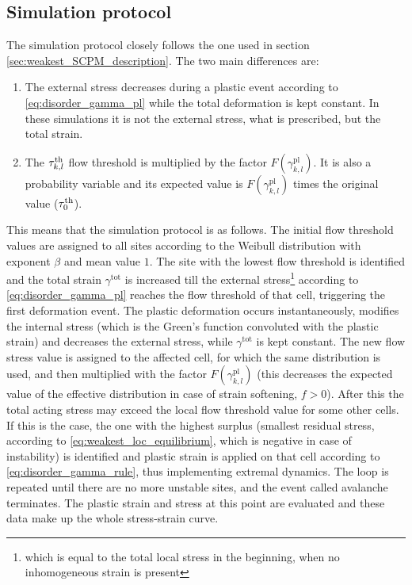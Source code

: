 \subsection{Simulation protocol}
The simulation protocol closely follows the one used in section \ref{sec:weakest_SCPM_description}. The two main differences are:
\begin{enumerate}
\item The external stress decreases during a plastic event according to \cref{eq:disorder_gamma_pl} while the total deformation is kept constant. In these simulations it is not the external stress, what is prescribed, but the total strain.
\item The $\tau _{k,l}^{{\rm{th}}}$ flow threshold is multiplied by the factor $F\left( {\gamma _{k,l}^{{\text{pl}}}} \right)$. It is also a probability variable and its expected value is $F\left( {\gamma _{k,l}^{{\text{pl}}}} \right)$ times the original value ($\tau _0^{{\rm{th}}}$).
\end{enumerate}
This means that the simulation protocol is as follows. The initial flow threshold values are assigned to all sites according to the Weibull distribution with exponent $\beta$ and mean value $1$. The site with the lowest flow threshold is identified and the total strain ${\gamma ^{{\text{tot}}}}$ is increased till the external stress\footnote{which is equal to the total local stress in the beginning, when no inhomogeneous strain is present} according to \cref{eq:disorder_gamma_pl} reaches the flow threshold of that cell, triggering the first deformation event. The plastic deformation occurs instantaneously, modifies the internal stress (which is the Green's function convoluted with the plastic strain) and decreases the external stress, while ${\gamma ^{{\text{tot}}}}$ is kept constant. The new flow stress value is assigned to the affected cell, for which the same distribution is used, and then multiplied with the factor $F\left( {\gamma _{k,l}^{{\text{pl}}}} \right)$ (this decreases the expected value of the effective distribution in case of strain softening, $f>0$). After this the total acting stress may exceed the local flow threshold value for some other cells. If this is the case, the one with the highest surplus (smallest residual stress, according to \cref{eq:weakest_loc_equilibrium}, which is negative in case of instability) is identified and plastic strain is applied on that cell according to \cref{eq:disorder_gamma_rule}, thus implementing extremal dynamics. The loop is repeated until there are no more unstable sites, and the event called avalanche terminates. The plastic strain and stress at this point are evaluated and these data make up the whole stress-strain curve.

